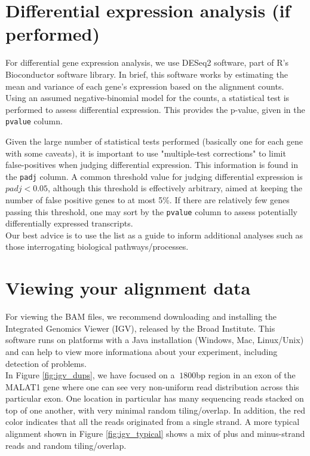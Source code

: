 \documentclass{article}
\begin{document}
\section{Differential expression analysis (if performed)}

For differential gene expression analysis, we use DESeq2 \cite{deseq2} software, part of R's Bioconductor software library.  In brief, this software works by estimating the mean and variance of each gene's expression based on the 
alignment counts.  Using an assumed negative-binomial model for the counts, a statistical test is performed to assess differential expression.  This provides the p-value, given in the \verb|pvalue| column.  

Given the large number of statistical tests performed (basically one for each gene with some caveats), it is important to use "multiple-test corrections" to limit false-positives when judging differential expression.
This information is found in the \verb|padj| column.  A common threshold value for judging differential expression is $padj < 0.05$, although this threshold is effectively arbitrary, aimed at keeping the number of false positive genes to at most 5\%.  If there are relatively few genes passing this threshold, one may sort by the \verb|pvalue| column to assess potentially differentially expressed transcripts.\\

Our best advice is to use the list as a guide to inform additional analyses such as those interrogating biological pathways/processes.  

\section{Viewing your alignment data}
\label{sec:igv}
For viewing the BAM files, we recommend downloading and installing the Integrated Genomics Viewer (IGV), released by the Broad Institute.  This software runs on platforms with a Java installation (Windows, Mac, Linux/Unix) and can help to view more informationa about your experiment, including detection of problems. \\

In Figure \ref{fig:igv_dups}, we have focused on a $~1800$bp region in an exon of the MALAT1 gene where one can see very non-uniform read distribution across this particular exon.  One location in particular has many sequencing reads stacked on top of one another, with very minimal random tiling/overlap.  In addition, the red color indicates that all the reads originated from a single strand.  A more typical alignment shown in Figure \ref{fig:igv_typical} shows a mix of plus and minus-strand reads and random tiling/overlap.
\end{document}
